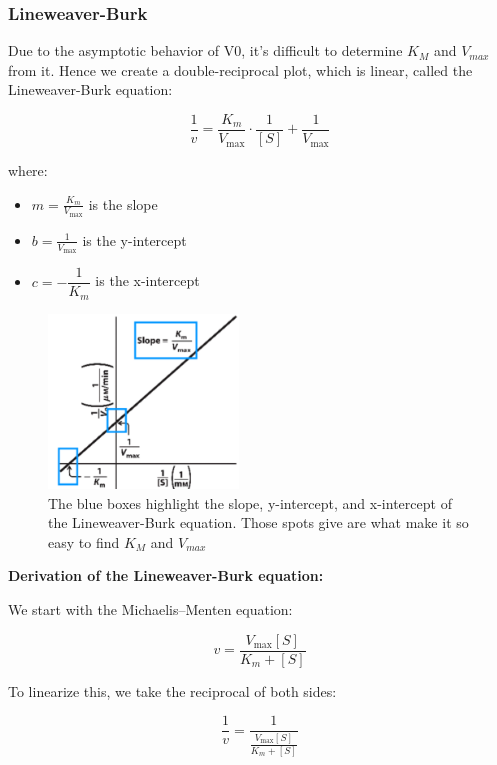 \documentclass[../main.tex]{subfiles}
\begin{document}
\subsubsection{\gls{Lineweaver-Burk}}

Due to the asymptotic behavior of V0, it's difficult to determine $K_{M}$ and $V_{max}$ from it. Hence we create a double-reciprocal plot, which is linear, called the Lineweaver-Burk equation:


\begin{equation}
	\frac{1}{v} = \frac{K_m}{V_{\max}} \cdot \frac{1}{[S]} + \frac{1}{V_{\max}}
\end{equation}


where:
\begin{itemize}
	\item \( m = \frac{K_m}{V_{\max}} \) is the slope
	\item \( b = \frac{1}{V_{\max}} \) is the y-intercept
	\item \(c = -\dfrac{1}{K_{m}}\) is the x-intercept
\end{itemize}

\begin{figure}[h]
	\centering
	\includegraphics[width=0.45\textwidth]{LW-Burk}
	\caption{The blue boxes highlight the slope, y-intercept, and x-intercept of the Lineweaver-Burk equation. Those spots give are what make it so easy to find $K_{M}$ and $V_{max}$}
\end{figure}


\textbf{Derivation of the Lineweaver-Burk equation: }

We start with the Michaelis--Menten equation:

\begin{equation}
	v = \frac{V_{\max}[S]}{K_m + [S]}
\end{equation}

To linearize this, we take the reciprocal of both sides:

\begin{equation}
	\frac{1}{v} = \frac{1}{\frac{V_{\max}[S]}{K_m + [S]}}
\end{equation}
\end{document}
